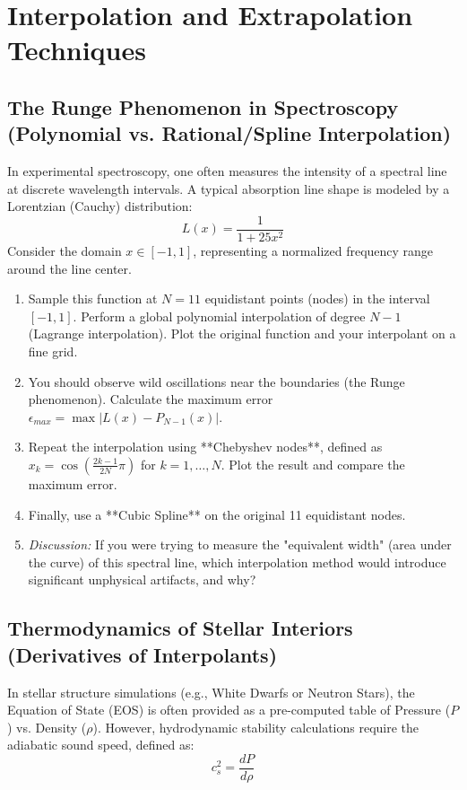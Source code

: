\section{Interpolation and Extrapolation Techniques}\label{sec:interpolation}

\subsection{The Runge Phenomenon in Spectroscopy (Polynomial vs. Rational/Spline Interpolation)}

In experimental spectroscopy, one often measures the intensity of a spectral line at discrete wavelength intervals. A typical absorption line shape is modeled by a Lorentzian (Cauchy) distribution:
$$ L(x) = \frac{1}{1 + 25x^2} $$
Consider the domain $x \in [-1, 1]$, representing a normalized frequency range around the line center.

\begin{enumerate}
    \item Sample this function at $N=11$ equidistant points (nodes) in the interval $[-1, 1]$. Perform a global polynomial interpolation of degree $N-1$ (Lagrange interpolation). Plot the original function and your interpolant on a fine grid.
    \item You should observe wild oscillations near the boundaries (the Runge phenomenon). Calculate the maximum error $\epsilon_{max} = \max |L(x) - P_{N-1}(x)|$.
    \item Repeat the interpolation using **Chebyshev nodes**, defined as $x_k = \cos\left(\frac{2k-1}{2N}\pi\right)$ for $k=1,\dots,N$. Plot the result and compare the maximum error.
    \item Finally, use a **Cubic Spline** on the original 11 equidistant nodes.
    \item \textit{Discussion:} If you were trying to measure the "equivalent width" (area under the curve) of this spectral line, which interpolation method would introduce significant unphysical artifacts, and why?
\end{enumerate}

\vspace{0.5cm}

\subsection{Thermodynamics of Stellar Interiors (Derivatives of Interpolants)}

In stellar structure simulations (e.g., White Dwarfs or Neutron Stars), the Equation of State (EOS) is often provided as a pre-computed table of Pressure ($P$) vs. Density ($\rho$). However, hydrodynamic stability calculations require the adiabatic sound speed, defined as:
$$ c_s^2 = \frac{dP}{d\rho} $$

